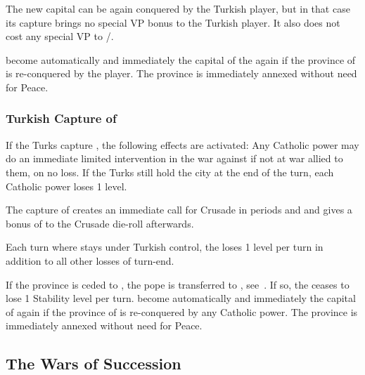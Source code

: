 \bparag The new capital can be again conquered by the Turkish player, but in
that case its capture brings no special VP bonus to the Turkish player. It
also does not cost any special VP to \HAB/\AUS.

\bparag {} become automatically and immediately the capital of the
 again if the province of  is
re-conquered by the \HAB player. The province is immediately annexed without
need for Peace.


\subsubsection{Turkish Capture of \villeRoma}\label{chSpecific:Fall Roma}
\aparag If the Turks capture , the following effects are
activated:
\bparag Any Catholic power may do an immediate limited intervention in the war
against \TUR if not at war allied to them, on no \STAB loss.
\bparag If the Turks still hold the city at the end of the turn, each Catholic
power loses 1 \STAB level.

 The capture of \villeRoma creates an
immediate call for Crusade in periods  and  and gives a
bonus of  to the Crusade die-roll afterwards.

Each turn where \villeRoma stays under Turkish control, the \SDCF loses 1
\STAB level per turn in addition to all other losses of turn-end.

If the province \provinceLazio is ceded to \TUR, the pope is transferred to
\VENven, see~.
\bparag If so, the \SDCF ceases to lose 1 Stability level per turn.
\bparag \villeRoma become automatically and immediately the capital of
\payspapaute again if the province of  is re-conquered by any
Catholic power. The province is immediately annexed without need for Peace.



\subsection{The Wars of Succession}

\label{chSpecific:War of Succession}


